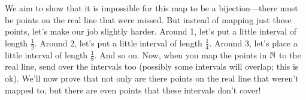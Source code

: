 \documentclass[11pt,twoside=off,numbers=noenddot]{scrbook}
\begin{document}
\begin{proofsketch}
\begin{figure}[h]
    \end{figure}

    We aim to show that it is impossible for this map to be a bijection---there must be points on the real line that were missed. But instead of mapping just these points, let's make our job slightly harder. Around 1, let's put a little interval of length $\frac{1}{2}$. Around 2, let's put a little interval of length $\frac{1}{4}$. Around 3, let's place a little interval of length $\frac{1}{8}$. And so on. Now, when you map the points in $\mathbb N$ to the real line, send over the intervals too (possibly some intervals will overlap; this is ok). We'll now prove that not only are there points on the real line that weren't mapped to, but there are even points that these intervals don't cover!
    \begin{figure}[h]
        \centering
        \usetikzlibrary{arrows.meta, positioning, fit, backgrounds, shadows}
\end{figure}
\end{proofsketch}
\end{document}
